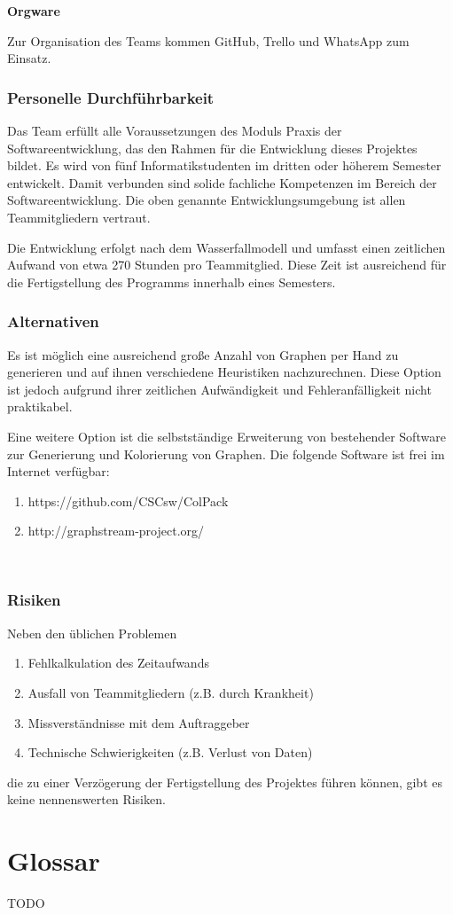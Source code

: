 \documentclass{article}
\begin{document}
	\textbf{Orgware}
	
	Zur Organisation des Teams kommen GitHub, Trello und WhatsApp zum Einsatz.
	
	\subsubsection{Personelle Durchführbarkeit}
	Das Team erfüllt alle Voraussetzungen des Moduls Praxis der Softwareentwicklung, das den Rahmen für die Entwicklung dieses Projektes bildet. Es wird von fünf Informatikstudenten im dritten oder höherem Semester entwickelt. Damit verbunden sind solide fachliche Kompetenzen im Bereich der Softwareentwicklung. Die oben genannte Entwicklungsumgebung ist allen Teammitgliedern vertraut.
	
	Die Entwicklung erfolgt nach dem Wasserfallmodell und umfasst einen zeitlichen Aufwand von etwa 270 Stunden pro Teammitglied. Diese Zeit ist ausreichend für die Fertigstellung des Programms innerhalb eines Semesters.
	
	
	\subsubsection{Alternativen}
	Es ist möglich eine ausreichend große Anzahl von Graphen per Hand zu generieren und auf ihnen verschiedene Heuristiken nachzurechnen. Diese Option ist jedoch aufgrund ihrer zeitlichen Aufwändigkeit und Fehleranfälligkeit nicht praktikabel.
	
	Eine weitere Option ist die selbstständige Erweiterung von bestehender Software zur Generierung und Kolorierung von Graphen. Die folgende Software ist frei im Internet verfügbar:
	\begin{enumerate}[--]
		\item{https://github.com/CSCsw/ColPack}
		\item{http://graphstream-project.org/}
	\end{enumerate}
	
	~\newpage
	\subsubsection{Risiken}
	Neben den üblichen Problemen
	\begin{enumerate}[--]
		\item{Fehlkalkulation des Zeitaufwands}
		\item{Ausfall von Teammitgliedern (z.B. durch Krankheit)}
		\item{Missverständnisse mit dem Auftraggeber}
		\item{Technische Schwierigkeiten (z.B. Verlust von Daten)}
	\end{enumerate}
	die zu einer Verzögerung der Fertigstellung des Projektes führen können, gibt es keine nennenswerten Risiken.
	
	\section{Glossar}
	
	TODO
	
	\glsaddall
	\printglossaries
\end{document}

